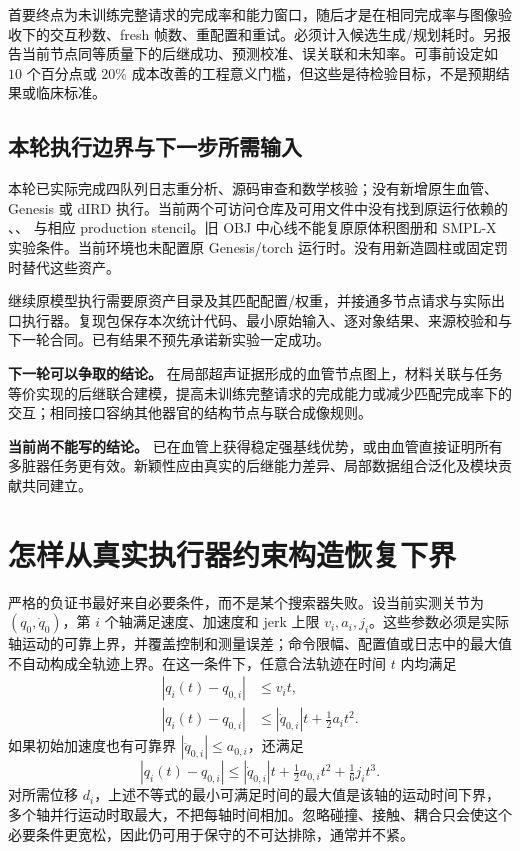 \documentclass[11pt,a4paper,fontset=fandol]{ctexart}
\theoremstyle{definition}
\theoremstyle{remark}\newtheorem{remark}[theorem]{说明}
\numberwithin{equation}{section}
\begin{document}
首要终点为未训练完整请求的完成率和能力窗口，随后才是在相同完成率与图像验收下的交互秒数、fresh 帧数、重配置和重试。必须计入候选生成/规划耗时。另报告当前节点同等质量下的后继成功、预测校准、误关联和未知率。可事前设定如 $10$ 个百分点或 $20\%$ 成本改善的工程意义门槛，但这些是待检验目标，不是预期结果或临床标准。

\subsection{本轮执行边界与下一步所需输入}
本轮已实际完成四队列日志重分析、源码审查和数学核验；没有新增原生血管、Genesis 或 dIRD 执行。当前两个可访问仓库及可用文件中没有找到原运行依赖的 、、 与相应 production stencil。旧 OBJ 中心线不能复原原体积图册和 SMPL-X 实验条件。当前环境也未配置原 Genesis/torch 运行时。没有用新造圆柱或固定罚时替代这些资产。

继续原模型执行需要原资产目录及其匹配配置/权重，并接通多节点请求与实际出口执行器。复现包保存本次统计代码、最小原始输入、逐对象结果、来源校验和与下一轮合同。已有结果不预先承诺新实验一定成功。

\begin{corebox}
\textbf{下一轮可以争取的结论。}
在局部超声证据形成的血管节点图上，材料关联与任务等价实现的后继联合建模，提高未训练完整请求的完成能力或减少匹配完成率下的交互；相同接口容纳其他器官的结构节点与联合成像规则。

\textbf{当前尚不能写的结论。}
已在血管上获得稳定强基线优势，或由血管直接证明所有多脏器任务更有效。新颖性应由真实的后继能力差异、局部数据组合泛化及模块贡献共同建立。
\end{corebox}


\appendix
\section{怎样从真实执行器约束构造恢复下界}
\label{app:physical}
严格的负证书最好来自必要条件，而不是某个搜索器失败。设当前实测关节为 $(q_0,\dot q_0)$，第 $i$ 个轴满足速度、加速度和 jerk 上限 $v_i,a_i,j_i$。这些参数必须是实际轴运动的可靠上界，并覆盖控制和测量误差；命令限幅、配置值或日志中的最大值不自动构成全轨迹上界。在这一条件下，任意合法轨迹在时间 $t$ 内均满足
\begin{align}
 |q_i(t)-q_{0,i}|&\le v_i t,\\
 |q_i(t)-q_{0,i}|&\le|\dot q_{0,i}|t+\tfrac12a_i t^2.
\end{align}
如果初始加速度也有可靠界 $|\ddot q_{0,i}|\le a_{0,i}$，还满足
\begin{equation}
 |q_i(t)-q_{0,i}|\le|\dot q_{0,i}|t+\tfrac12a_{0,i}t^2+\tfrac16j_i t^3.
\end{equation}
对所需位移 $d_i$，上述不等式的最小可满足时间的最大值是该轴的运动时间下界，多个轴并行运动时取最大，不把每轴时间相加。忽略碰撞、接触、耦合只会使这个必要条件更宽松，因此仍可用于保守的不可达排除，通常并不紧。
\end{document}

